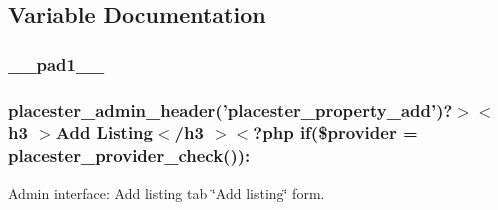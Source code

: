 \subsection{Variable Documentation}
\hypertarget{property__add__form_8php_ae8b4bb1441c6ab4dcb28a37bc46c8ead}{
\subsubsection[{\_\-\_\-pad1\_\-\_\-}]{ {\bf \_\-\_\-pad1\_\-\_\-}}}
\label{d6/d6d/property__add__form_8php_ae8b4bb1441c6ab4dcb28a37bc46c8ead}
\hypertarget{property__add__form_8php_aadbfeac03579e4f226beb15313a92dec}{
\subsubsection[{placester\_\-admin\_\-header}]{\setlength{\rightskip}{0pt plus 5cm}placester\_\-admin\_\-header('placester\_\-property\_\-add')?$>$$<$ h3 $>$Add Listing$<$/h3 $>$$<$?php {\bf if}(\$provider = placester\_\-provider\_\-check()):}}
\label{d6/d6d/property__add__form_8php_aadbfeac03579e4f226beb15313a92dec}


Admin interface: Add listing tab \char`\"{}Add listing\char`\"{} form. 

